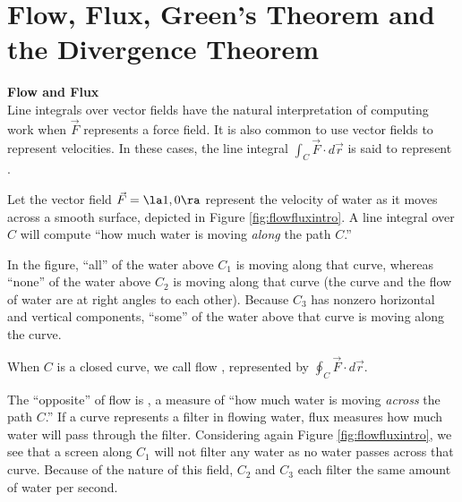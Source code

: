 \section{Flow, Flux, Green's Theorem and the Divergence Theorem}\label{sec:greensthm}

\noindent\textbf{\large Flow and Flux}\\

Line integrals over vector fields have the natural interpretation of computing work when $\vec F$ represents a force field. It is also common to use vector fields to represent velocities. In these cases, the line integral $\int_C \vec F\cdot d\vec r$ is said to represent .


Let the vector field $\vec F = \la 1,0\ra$ represent the velocity of water as it moves across a smooth surface, depicted in Figure \ref{fig:flowfluxintro}. A line integral over $C$ will compute ``how much water is moving \emph{along} the path $C$.'' 

In the figure, ``all'' of the water above $C_1$ is moving along that curve, whereas ``none'' of the water above $C_2$ is moving along that curve (the curve and the flow of water are at right angles to each other). Because $C_3$ has nonzero horizontal and vertical components, ``some'' of the water above that curve is moving along the curve.

When $C$ is a closed curve, we call flow , represented by $\oint_C \vec F\cdot d\vec r$.


The ``opposite'' of flow is , a measure of ``how much water is moving \emph{across} the path $C$.'' If a curve represents a filter in flowing water, flux measures how much water will pass through the filter. Considering again Figure \ref{fig:flowfluxintro}, we see that a screen along $C_1$ will not filter any water as no water passes across that curve. Because of the nature of this field,  $C_2$ and $C_3$ each filter the same amount of water per second. 

